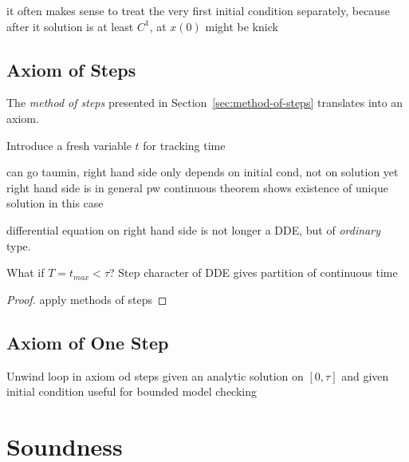 it often makes sense to treat the very first initial condition separately, because after it solution is at least $C^1$, at $x(0)$ might be knick

    \subsection{Axiom of Steps}
        \label{sec:axiom-of-steps}

        The \emph{method of steps} presented in Section~\ref{sec:method-of-steps} translates into an axiom.

        Introduce a fresh variable $t$ for tracking time

        can go taumin, right hand side only depends on initial cond, not on solution yet
        right hand side is in general pw continuous
        theorem shows existence of unique solution in this case

        \begin{calculus}
        \end{calculus}

        differential equation on right hand side is not longer a DDE, but of \emph{ordinary} type. 

        What if $T=t_{max} < \tau$?
        Step character of DDE gives partition of continuous time

        \begin{proof}
            apply methods of steps
        \end{proof}

    \subsection{Axiom of One Step}
        \label{sex:axiom-of-one-step}

        Unwind loop in axiom od steps
        given an analytic solution on $[0,\tau]$ and given initial condition
        useful for bounded model checking

\section{Soundness}
    \label{sec:soundness}

